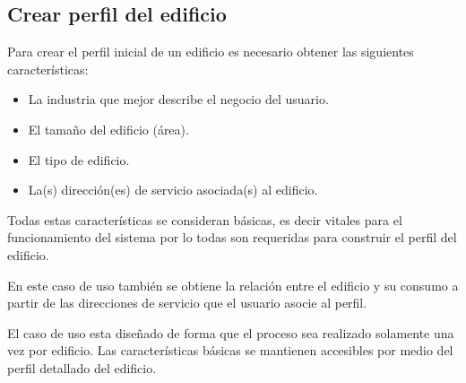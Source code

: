 
\subsection{Crear perfil del edificio}

Para crear el perfil inicial de un edificio es necesario obtener las siguientes
características:

\begin{itemize}
\item La industria que mejor describe el negocio del usuario.
\item El tamaño del edificio (área).
\item El tipo de edificio.
\item La(s) dirección(es) de servicio asociada(s) al edificio.
\end{itemize}

Todas estas características se consideran básicas, es decir vitales para el
funcionamiento del sistema por lo todas son requeridas para construir el perfil
del edificio.

En este caso de uso también se obtiene la relación entre el edificio y su consumo
a partir de las direcciones de servicio que el usuario asocie al perfil.

El caso de uso esta diseñado de forma que el proceso sea realizado solamente
una vez por edificio. Las características básicas se mantienen accesibles por
medio del perfil detallado del edificio.

